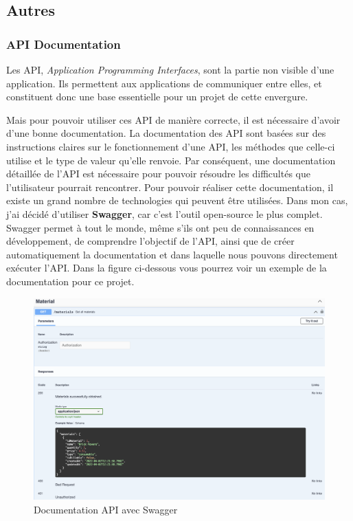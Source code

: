   
\subsection{Autres}
\subsubsection{API Documentation}

Les API, \textit{Application Programming Interfaces}, sont la partie non visible d'une application. Ils permettent aux applications de communiquer entre elles, et constituent donc une base essentielle pour un projet de cette envergure.

Mais pour pouvoir utiliser ces API de manière correcte, il est nécessaire d'avoir d'une bonne documentation. La documentation des API sont basées sur des instructions claires sur le fonctionnement d'une API, les méthodes que celle-ci utilise et le type de valeur qu'elle renvoie.
Par conséquent, une documentation détaillée de l'API est nécessaire pour pouvoir résoudre les difficultés que l'utilisateur pourrait rencontrer.
\newpage
Pour pouvoir réaliser cette documentation, il existe un grand nombre de technologies qui peuvent être utilisées. Dans mon cas, j'ai décidé d'utiliser \textbf{Swagger}, car c'est l'outil open-source le plus complet.
Swagger permet à tout le monde, même s'ils ont peu de connaissances en développement, de comprendre l'objectif de l'API, ainsi que de créer automatiquement la documentation et dans laquelle nous pouvons directement exécuter l'API. Dans la figure ci-dessous vous pourrez voir un exemple de la documentation pour ce projet.

\begin{figure}[H]
  \centering
  \includegraphics[width=0.75\linewidth]{img/docApi.png}
  \caption{ Documentation API avec Swagger}
  \label{Swagger}
\end{figure}
